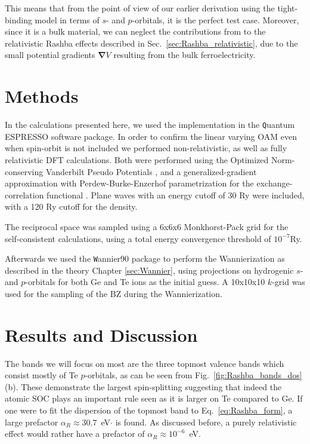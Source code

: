 This means that from the point of view of our earlier derivation using the tight-binding model in terms of $s$- and $p$-orbitals, it is the perfect test case.
Moreover, since it is a bulk material, we can neglect the contributions from to the relativistic Rashba effects described in Sec.~\ref{sec:Rashba_relativistic}, due to the small potential gradients $\bm{\nabla}V$ resulting from the bulk ferroelectricity.

\section{Methods}
In the calculations presented here, we used the implementation in the {\texttt Quantum ESPRESSO} software package\cite{Giannozzi2009}.
In order to confirm the linear varying OAM even when spin-orbit is not included we performed non-relativistic, as well as fully relativistic DFT calculations.
Both were performed using the Optimized Norm-conserving Vanderbilt Pseudo Potentials \cite{Hamann2013}, and a generalized-gradient approximation with Perdew-Burke-Enzerhof parametrization for the exchange-correlation functional \cite{Perdew1996}.
Plane waves with an energy cutoff of 30 Ry were included, with a 120 Ry cutoff for the density.

The reciprocal space was sampled using a 6x6x6 Monkhorst-Pack grid\cite{Pack1977} for the self-consistent calculations, using a total energy convergence threshold of $10^{-7}$Ry.

Afterwards we used the {\texttt Wannier90} package \cite{Mostofi2014AnFunctions} to perform the Wannierization as described in the theory Chapter \ref{sec:Wannier}, using projections on hydrogenic $s$- and $p$-orbitals for both Ge and Te ions as the initial guess.
A 10x10x10 $k$-grid was used for the sampling of the BZ during the Wannierization. 


\section{Results and Discussion}

The bands we will focus on most are the three topmost valence bands which consist mostly of Te $p$-orbitals, as can be seen from Fig.~\ref{fig:Rashba_bands_dos}(b).
These demonstrate the largest spin-splitting suggesting that indeed the atomic SOC plays an important rule seen as it is larger on Te compared to Ge.
If one were to fit the dispersion of the topmost band to Eq.~\ref{eq:Rashba_form}, a large prefactor $\alpha_R\approx 30.7$~eV$\cdot$\angstrom \cite{DiSante2013} is found.
As discussed before, a purely relativistic effect would rather have a prefactor of $\alpha_R \approx 10^{-6}$~eV.

